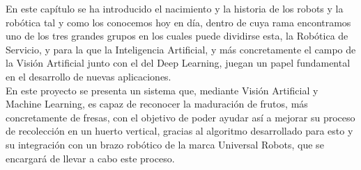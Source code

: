 

En este capítulo se ha introducido el nacimiento y la historia de los robots y la robótica tal y como los conocemos hoy en día, dentro de cuya rama encontramos uno de los tres grandes grupos en los cuales puede dividirse esta, la Robótica de Servicio, y para la que la Inteligencia Artificial, y más concretamente el campo de la Visión Artificial junto con el del Deep Learning, %
juegan un papel fundamental en el desarrollo de nuevas aplicaciones.\\

En este proyecto se presenta un sistema que, mediante Visión Artificial y Machine Learning, es capaz de reconocer la maduración de frutos, más concretamente de fresas, con el objetivo de poder ayudar así a mejorar su proceso de recolección en un huerto vertical, gracias al algoritmo desarrollado para esto y su integración con un brazo robótico de la marca Universal Robots, que se encargará de llevar a cabo este proceso.

